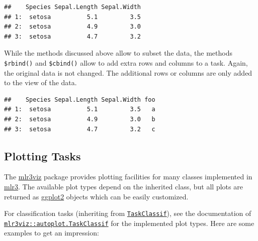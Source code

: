 \documentclass[]{scrbook}
\newenvironment{Shaded}{\begin{snugshade}}{\end{snugshade}}
\newcommand{\CommentTok}[1]{\textcolor[rgb]{0.56,0.35,0.01}{\textit{#1}}}
\newcommand{\DataTypeTok}[1]{\textcolor[rgb]{0.13,0.29,0.53}{#1}}
\newcommand{\DecValTok}[1]{\textcolor[rgb]{0.00,0.00,0.81}{#1}}
\newcommand{\KeywordTok}[1]{\textcolor[rgb]{0.13,0.29,0.53}{\textbf{#1}}}
\newcommand{\NormalTok}[1]{#1}
\newcommand{\OperatorTok}[1]{\textcolor[rgb]{0.81,0.36,0.00}{\textbf{#1}}}
\renewenvironment{Shaded} {\begin{snugshade}\small} {\end{snugshade}}
\begin{document}
\begin{verbatim}
##    Species Sepal.Length Sepal.Width
## 1:  setosa          5.1         3.5
## 2:  setosa          4.9         3.0
## 3:  setosa          4.7         3.2
\end{verbatim}

While the methods discussed above allow to subset the data, the methods \texttt{\$rbind()} and \texttt{\$cbind()} allow to add extra rows and columns to a task.
Again, the original data is not changed.
The additional rows or columns are only added to the view of the data.

\begin{Shaded}
\end{Shaded}

\begin{verbatim}
##    Species Sepal.Length Sepal.Width foo
## 1:  setosa          5.1         3.5   a
## 2:  setosa          4.9         3.0   b
## 3:  setosa          4.7         3.2   c
\end{verbatim}

\hypertarget{autoplot-task}{%
\subsection{Plotting Tasks}\label{autoplot-task}}

The \href{https://mlr3viz.mlr-org.com}{mlr3viz} package provides plotting facilities for many classes implemented in \href{https://mlr3.mlr-org.com}{mlr3}.
The available plot types depend on the inherited class, but all plots are returned as \href{https://cran.r-project.org/package=ggplot2}{ggplot2} objects which can be easily customized.

For classification tasks (inheriting from \href{https://mlr3.mlr-org.com/reference/TaskClassif.html}{\texttt{TaskClassif}}), see the documentation of \href{https://mlr3viz.mlr-org.com/reference/autoplot.TaskClassif.html}{\texttt{mlr3viz::autoplot.TaskClassif}} for the implemented plot types.
Here are some examples to get an impression:
\end{document}

